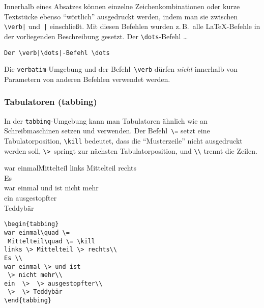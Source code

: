 Innerhalb eines Absatzes können einzelne Zeichenkombinationen
oder kurze Textstücke ebenso "`wörtlich"' ausgedruckt
werden, indem man sie zwischen \verb.\verb|. und~\verb.|.
einschließt.
Mit diesen Befehlen wurden z.\,B.\ alle \LaTeX-Befehle in der
vorliegenden Beschreibung gesetzt.
\exa
Der \verb|\dots|-Befehl \dots
\exb
\begin{verbatim}
Der \verb|\dots|-Befehl \dots
\end{verbatim}
\exc
 
Die \texttt{verbatim}-Umgebung und der Befehl~\verb|\verb|
dürfen \emph{nicht} innerhalb von Parametern von anderen Befehlen
verwendet werden.


 
\subsubsection{Tabulatoren (tabbing)} \label{tabbing}
 
In der \texttt{tabbing}-Umgebung kann man Tabulatoren ähnlich wie
an Schreibmaschinen setzen und verwenden.
Der Befehl~\verb|\=| setzt eine Tabulatorposition,
\verb|\kill| bedeutet, dass die "`Musterzeile"' nicht ausgedruckt werden
soll,
\verb|\>|~springt zur nächsten Tabulatorposition,
und \verb|\\| trennt die Zeilen.
%
\par\vspace{0pt plus5\baselineskip}
\pagebreak[3]\vspace{0pt plus-5\baselineskip}
%
\exa
\begin{tabbing}
war einmal\quad \=
 Mittelteil\quad \= \kill
links \> Mittelteil \> rechts\\
Es \\
war einmal \> und ist
 \> nicht mehr\\
ein  \>  \> ausgestopfter\\
 \>  \> Teddybär
\end{tabbing}
\exb
\begin{verbatim}
\begin{tabbing}
war einmal\quad \=
 Mittelteil\quad \= \kill
links \> Mittelteil \> rechts\\
Es \\
war einmal \> und ist
 \> nicht mehr\\
ein  \>  \> ausgestopfter\\
 \>  \> Teddybär
\end{tabbing}
\end{verbatim}
\exc


